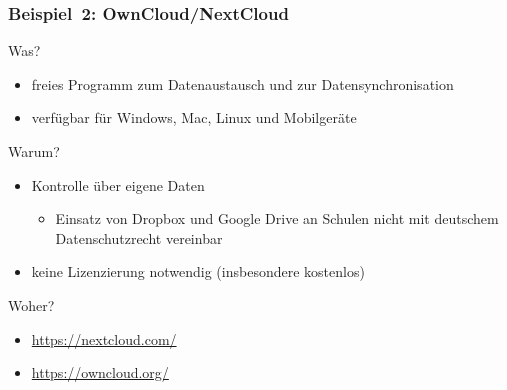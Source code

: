 \documentclass{beamer}
\begin{document}
\begin{frame}
  \frametitle{Beispiel~2: OwnCloud/NextCloud}

  \onslide<+->

  \begin{block}{Was?}
    \begin{itemize}
    \item freies Programm zum Datenaustausch und zur Datensynchronisation
    \item verfügbar für Windows, Mac, Linux und Mobilgeräte
    \end{itemize}
  \end{block}

  \onslide<+->

  \begin{block}{Warum?}
    \begin{itemize}
    \item Kontrolle über eigene Daten
      \begin{itemize}
      \item Einsatz von Dropbox und Google Drive an Schulen nicht mit
        deutschem Datenschutzrecht vereinbar
      \end{itemize}
    \item keine Lizenzierung notwendig (insbesondere kostenlos)
    \end{itemize}
  \end{block}

  \onslide<+->

  \begin{block}{Woher?}
    \begin{itemize}
    \item \url{https://nextcloud.com/}
    \item \url{https://owncloud.org/}
    \end{itemize}
  \end{block}


\end{frame}
\end{document}
